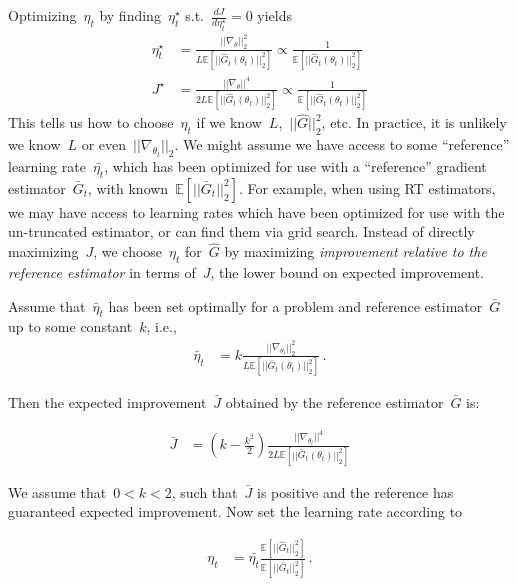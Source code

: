 Optimizing~$\eta_t$ by finding~$\eta_t^\star$ s.t.~${\frac{dJ}{d\eta_t^\star} = 0}$ yields
\begin{align}
\eta_t^\star &= \frac{||\nabla_\theta||_2^2}{L \mathbb{E}[||\hat{G}_t(\theta_{t})||_2^2]} \propto \frac{1}{\mathbb{E}[||\hat{G}_t(\theta_{t})||_2^2]}\\
J^\star &= \frac{||\nabla_\theta||^4}{2 L \mathbb{E}[||\hat{G}_t(\theta_{t})||_2^2]} \propto \frac{1}{\mathbb{E}[||\hat{G}_t(\theta_{t})||_2^2]}
\end{align}
This tells us how to choose~$\eta_t$ if we know~$L$,~$||\hat{G}||_2^2$, etc.
In practice, it is unlikely we know~$L$ or even~$||\nabla_{\theta_t}||_2$.
We might assume we have access to some ``reference'' learning rate~$\bar{\eta_t}$, which has been optimized for use with a ``reference'' gradient estimator~$\bar{G}_t$, with known~$\mathbb{E}[||\bar{G}_t||_2^2]$. For example, when using
RT estimators, we may have access to learning rates which have been optimized for use with the un-truncated estimator, or can find them via grid search.
Instead of directly maximizing~$J$, we choose~$\eta_t$ for~$\hat{G}$ by maximizing \textit{improvement relative to the reference estimator} in terms of~$J$, the lower bound on expected improvement.

Assume that~$\bar{\eta}_t$ has been set optimally for a problem and reference estimator~$\bar{G}$ up to some constant~$k$, i.e.,
\begin{align}
\bar{\eta}_t &= k \frac{||\nabla_{\theta_t}||_2^2}{L \mathbb{E}[||\bar{G}_t(\theta_{t})||_2^2]}\,.
\end{align}
\vspace{-1.25\baselineskip}

Then the expected improvement~$\bar{J}$ obtained by the reference estimator~$\bar{G}$ is:
\vspace{-1.75\baselineskip}

\begin{align}
\bar{J} &= (k - \frac{k^2}{2}) \frac{||\nabla_{\theta_t}||^4}{2 L \mathbb{E}[||\bar{G}_t(\theta_{t})||_2^2]}
\end{align}
\vspace{-1.25\baselineskip}


We assume that~${0 < k < 2}$, such that~$\bar{J}$ is positive and the reference has guaranteed expected improvement.
Now set the learning rate according to
\vspace{-1.75\baselineskip}

\begin{align}
\label{eq:rel-lr}
\eta_t &=
\bar{\eta_t} \frac{\mathbb{E}[||\hat{G}_t||_2^2]}{\mathbb{E}[||\bar{G}_t||_2^2]}\,.
\end{align}
\vspace{-1.25\baselineskip}

